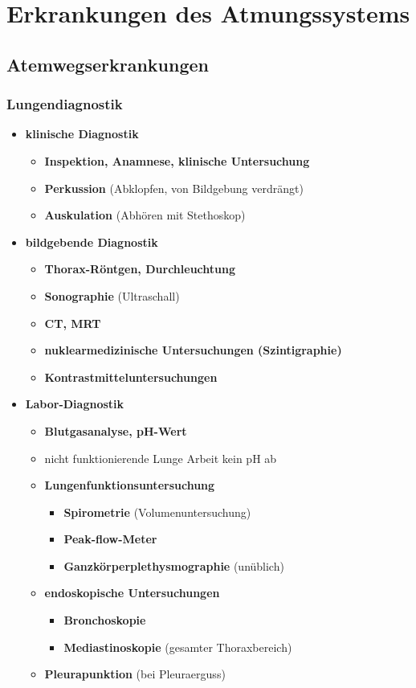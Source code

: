 \section{Erkrankungen des Atmungssystems}
\subsection{Atemwegserkrankungen}
	\subsubsection{Lungendiagnostik}
		\begin{itemize}
			\item \textbf{klinische Diagnostik}
				\begin{itemize}
					\item \textbf{Inspektion, Anamnese, klinische Untersuchung}
					\item \textbf{Perkussion} (Abklopfen, von Bildgebung verdrängt)
					\item \textbf{Auskulation} (Abhören mit Stethoskop)
				\end{itemize}
			\item \textbf{bildgebende Diagnostik}
				\begin{itemize}
					\item \textbf{Thorax-Röntgen, Durchleuchtung}
					\item \textbf{Sonographie} (Ultraschall)
					\item \textbf{CT, MRT}
					\item \textbf{nuklearmedizinische Untersuchungen (Szintigraphie)}
					\item \textbf{Kontrastmitteluntersuchungen} 
				\end{itemize}
			\item \textbf{Labor-Diagnostik}
				\begin{itemize}
					\item \textbf{Blutgasanalyse, pH-Wert}
					\item nicht funktionierende Lunge Arbeit kein pH ab
			\item \textbf{Lungenfunktionsuntersuchung}
				\begin{itemize}
					\item \textbf{Spirometrie} (Volumenuntersuchung)
					\item \textbf{Peak-flow-Meter}
					\item \textbf{Ganzkörperplethysmographie} (unüblich)
				\end{itemize}
			\item \textbf{endoskopische Untersuchungen}
				\begin{itemize}
					\item \textbf{Bronchoskopie}
					\item \textbf{Mediastinoskopie} (gesamter Thoraxbereich)
				\end{itemize}
			\item \textbf{Pleurapunktion} (bei Pleuraerguss)
		\end{itemize}

\end{itemize}
